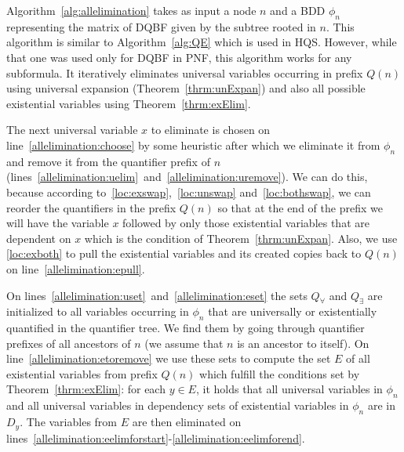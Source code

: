 \documentclass[
  digital, %
  color,
  twoside, %
  table,   %
  nolof,     %
  nolot,     %
]{fithesis3}
\theoremstyle{definition}
\theoremstyle{remark}
\newcommand{\prefix}[1]{Q({#1})}
\begin{document}
Algorithm~\ref{alg:allelimination} takes as input a node $n$ and a BDD $\phi_n$ representing the matrix of DQBF given by the subtree rooted in $n$. This algorithm is similar to Algorithm~\ref{alg:QE} which is used in HQS. However, while that one was used only for DQBF in PNF, this algorithm works for any subformula. It iteratively eliminates universal variables occurring in prefix $\prefix{n}$ using universal expansion (Theorem~\ref{thrm:unExpan}) and also all possible existential variables using Theorem~\ref{thrm:exElim}.

The next universal variable $x$ to eliminate is chosen on line~\ref{allelimination:choose} by some heuristic after which we eliminate it from $\phi_n$ and remove it from the quantifier prefix of $n$ (lines~\ref{allelimination:uelim}~and~\ref{allelimination:uremove}). We can do this, because according to~\eqref{loc:exswap},~\eqref{loc:unswap} and~\eqref{loc:bothswap}, we can reorder the quantifiers in the prefix $\prefix{n}$ so that at the end of the prefix we will have the variable $x$ followed by only those existential variables that are dependent on $x$ which is the condition of Theorem~\ref{thrm:unExpan}. Also, we use \eqref{loc:exboth} to pull the existential variables and its created copies back to $\prefix{n}$ on line~\ref{allelimination:epull}.

On lines~\ref{allelimination:uset}~and~\ref{allelimination:eset} the sets $Q_{\forall}$ and $Q_{\exists}$ are initialized to all variables occurring in $\phi_n$ that are universally or existentially quantified in the quantifier tree. We find them by going through quantifier prefixes of all ancestors of $n$ (we assume that $n$ is an ancestor to itself). On line~\ref{allelimination:etoremove} we use these sets to compute the set $E$ of all existential variables from prefix $\prefix{n}$ which fulfill the conditions set by Theorem~\ref{thrm:exElim}: for each $y \in E$, it holds that all universal variables in $\phi_n$ and all universal variables in dependency sets of existential variables in $\phi_n$ are in $D_y$. The variables from $E$ are then eliminated on lines~\ref{allelimination:eelimforstart}-\ref{allelimination:eelimforend}.
\end{document}
